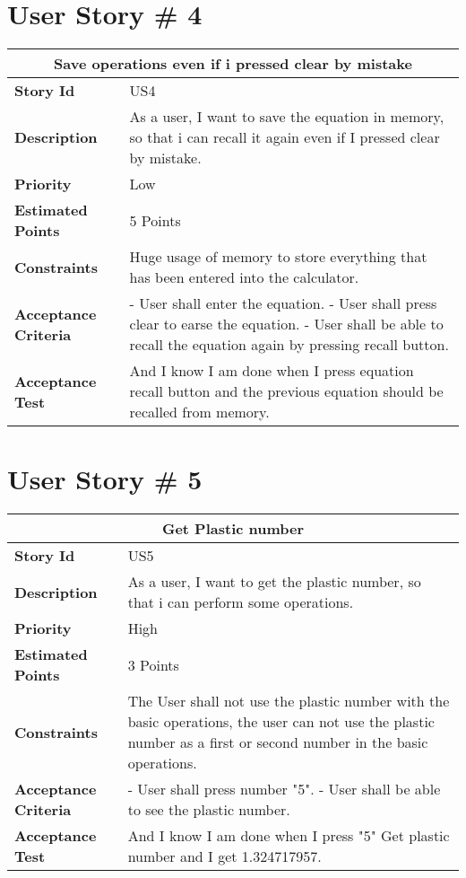 \documentclass{report}
\begin{document}
\section{User Story \# 4}
\begin{tabular}{|p{3.5cm}|p{9cm}| }
\hline
\multicolumn{2}{|c|}{Save operations even if i pressed clear by mistake} \\
\hline
\textbf {Story Id}& US4\\
\hline
\textbf{Description}& As a user, I want to save the equation in memory, so that i can recall it again even if I pressed clear by mistake.\\
\hline
\textbf{Priority} & Low \\
\hline
\textbf{Estimated Points} & 5 Points\\
\hline
\textbf{Constraints}& Huge usage of memory to store everything that has been entered into the calculator.\\
\hline
\textbf{Acceptance Criteria}& 
-   User shall enter the equation.\newline
-   User shall press clear to earse the equation.\newline
-   User shall be able to recall the equation again by pressing recall button.\\
\hline
\textbf{Acceptance Test}& And I know I am done when I press equation recall button and the previous equation should be recalled from memory. \\
\hline
\end{tabular}

\section{User Story \# 5}
\begin{tabular}{|p{3.5cm}|p{9cm}| }
\hline
\multicolumn{2}{|c|}{Get Plastic number} \\
\hline
\textbf {Story Id}& US5\\
\hline
\textbf{Description}& As a user, I want to get the plastic number, so that i can perform some operations.\\
\hline
\textbf{Priority} & High \\
\hline
\textbf{Estimated Points} & 3 Points \\
\hline
\textbf{Constraints}& The User shall not use the plastic number with the basic operations, the user can not use the plastic number as a first or second number in the basic operations.\\
\hline
\textbf{Acceptance Criteria}& 
-   User shall press number "5".\newline
-   User shall be able to see the plastic number.\\
\hline
\textbf{Acceptance Test}& And I know I am done when I press "5" Get plastic number and I get 1.324717957.\\
\hline
\end{tabular}
\end{document}
